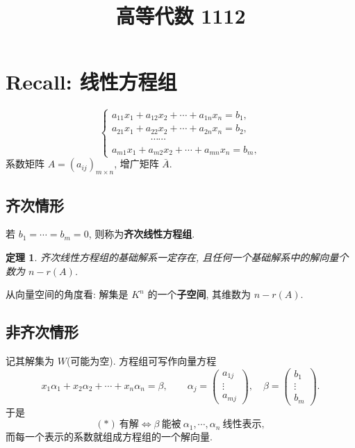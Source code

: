 \documentclass[UTF8,11pt]{ctexart}
\title{高等代数 1112}
\date{}
\theoremstyle{cnthm}
\newtheorem{thm}{定理}[section]
\begin{document}
\maketitle

\section{Recall: 线性方程组}

\begin{equation*}
\begin{cases}
a_{11}x_1+a_{12}x_2+\cdots+a_{1n}x_n=b_1,\\
a_{21}x_1+a_{22}x_2+\cdots+a_{2n}x_n=b_2,\\
\qquad\qquad\cdots\cdots\\
a_{m1}x_1+a_{m2}x_2+\cdots+a_{mn}x_n=b_m,
\end{cases}
\tag{$*$}
\end{equation*}
系数矩阵 $A=(a_{ij})_{m\times n}$, 增广矩阵 $\bar A$.

\subsection{齐次情形}

若 $b_1=\cdots=b_m=0$, 则称为\textbf{齐次线性方程组}.

\begin{thm}
齐次线性方程组的基础解系一定存在, 且任何一个基础解系中的解向量个数为 $n-r(A)$.
\end{thm}

从向量空间的角度看: 解集是 $K^n$ 的一个\textbf{子空间}, 其维数为 $n-r(A)$.

\subsection{非齐次情形}

记其解集为 $W$(可能为空). 方程组可写作向量方程
\[
x_1\alpha_1+x_2\alpha_2+\cdots+x_n\alpha_n=\beta,\qquad
\alpha_j=\begin{pmatrix}a_{1j}\\\vdots\\a_{mj}\end{pmatrix},\quad
\beta=\begin{pmatrix}b_1\\\vdots\\b_m\end{pmatrix}.
\]
于是
\[
(*)\ \text{有解}\iff\beta\ \text{能被}\ \alpha_1,\cdots,\alpha_n\ \text{线性表示},
\]
而每一个表示的系数就组成方程组的一个解向量.
\end{document}
